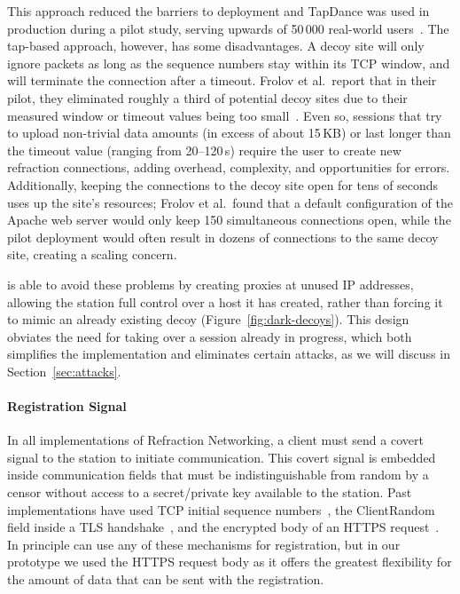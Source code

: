 This approach reduced the barriers to deployment and TapDance was used in production during a pilot study, serving upwards of 50\,000 real-world users~\cite{frolov2017isp}. 
The tap-based approach, however, has some disadvantages. A decoy site will only ignore packets as long as the sequence numbers stay within its TCP window, and will terminate the connection after a timeout. Frolov et al.\ report that in their pilot, they eliminated roughly a third of potential decoy sites due to their measured window or timeout values being too small~\cite{frolov2017isp}. Even so, sessions that try to upload non-trivial data amounts (in excess of about 15\,KB) or last longer than the timeout value (ranging from 20--120\,s) require the user to create new refraction connections, adding overhead, complexity, and opportunities for errors. Additionally, keeping the connections to the decoy site open for tens of seconds uses up the site's resources; Frolov et al.\ found that a default configuration of the Apache web server would only keep 150 simultaneous connections open, while the pilot deployment would often result in dozens of connections to the same decoy site, creating a scaling concern.

\scheme is able to avoid these problems by creating proxies at unused IP addresses, allowing the station full control over a host it has created, rather than forcing it to mimic an already existing decoy (Figure~\ref{fig:dark-decoys}).
This design obviates the need for taking over a session already in progress, which both simplifies the implementation and eliminates certain attacks, as we will discuss in Section~\ref{sec:attacks}.

\paragraph{Registration Signal} In all implementations of Refraction Networking, a client must send a covert signal to the station to initiate communication. This covert signal is  embedded inside communication fields that must be indistinguishable from random by a censor without access to a secret/private key available to the station. Past implementations have used TCP initial sequence numbers~\cite{cirripede11}, the ClientRandom field inside a TLS handshake~\cite{curveball11,telex11}, and the encrypted body of an HTTPS request~\cite{tapdance14}. In principle \scheme can use any of these mechanisms for registration, but in our prototype we used the HTTPS request body as it offers the greatest flexibility for the amount of data that can be sent with the registration.
